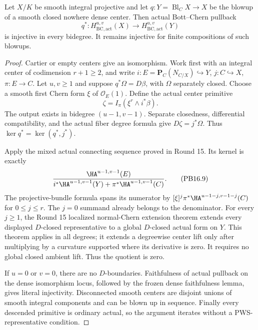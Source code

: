 \begin{theorem}
\label{r16pb:blowup}
Let $X/K$ be smooth integral projective and let
$q:Y=\operatorname{Bl}_C X\to X$ be the blowup of a smooth closed
nowhere dense center. Then actual Bott--Chern pullback
\[
 q^*:H_{\mathrm{BC,act}}^{u,v}(X)
             \longrightarrow H_{\mathrm{BC,act}}^{u,v}(Y)
 \tag{PB16.7}\label{r16pb:blowup-inj}
\]
is injective in every bidegree. It remains injective for finite
compositions of such blowups.
\end{theorem}

\begin{proof}
Cartier or empty centers give an isomorphism. Work first with an
integral center of codimension $r+1\geq2$, and write
$i:E=\mathbf P_C(N_{C/X})\hookrightarrow Y$, $j:C\hookrightarrow X$,
$\pi:E\to C$. Let $u,v\geq1$ and suppose
$q^*\Omega=D\beta$, with $\Omega$ separately closed. Choose a smooth
first Chern form $\xi$ of $\mathcal O_E(1)$. Define the actual center
primitive
\[
                  \zeta=I_\pi(\xi^r\wedge i^*\beta).
 \tag{PB16.8}\label{r16pb:center-primitive}
\]
The output exists in bidegree $(u-1,v-1)$. Separate closedness,
differential compatibility, and the actual fiber degree formula give
$D\zeta=j^*\Omega$. Thus $\ker q^*=\ker(q^*,j^*)$.

Apply the mixed actual connecting sequence proved in Round 15. Its
kernel is exactly
\[
 \frac{\HA^{u-1,v-1}(E)}
 {i^*\HA^{u-1,v-1}(Y)+\pi^*\HA^{u-1,v-1}(C)}.
 \tag{PB16.9}\label{r16pb:exceptional-quotient}
\]
The projective-bundle formula spans its numerator by
$[\xi]^j\pi^*\HA^{u-1-j,v-1-j}(C)$ for $0\leq j\leq r$.
The $j=0$ summand already belongs to the denominator. For every
$j\geq1$, the Round 15 localized normal-Chern extension theorem
extends every displayed $D$-closed representative to a global
$D$-closed actual form on $Y$. This theorem applies in all degrees;
it extends a degreewise center lift only after multiplying by a
curvature supported where its derivative is zero. It requires no
global closed ambient lift. Thus the quotient is zero.

If $u=0$ or $v=0$, there are no $D$-boundaries. Faithfulness of actual
pullback on the dense isomorphism locus, followed by the frozen dense
faithfulness lemma, gives literal injectivity. Disconnected smooth
centers are disjoint unions of smooth integral components and can be
blown up in sequence. Finally every descended primitive is ordinary
actual, so the argument iterates without a PWS-representative condition.
\end{proof}

